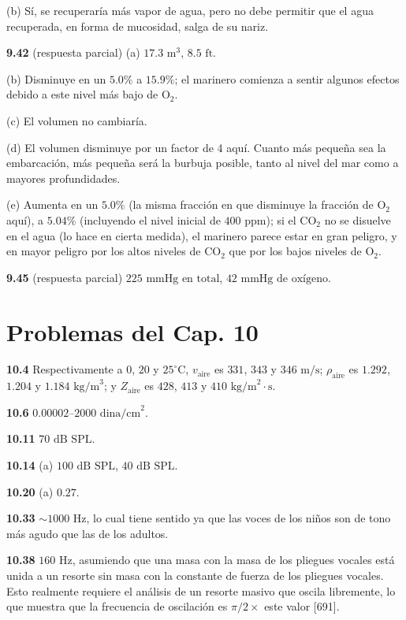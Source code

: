 \documentclass[12pt,a4paper]{book}
\begin{document}
(b) Sí, se recuperaría más vapor de agua, pero no debe permitir que el agua recuperada, en forma de mucosidad, salga de su nariz.

\noindent \textbf{9.42} (respuesta parcial) (a) $17.3\text{ m}^3$, $8.5\text{ ft}$.

(b) Disminuye en un $5.0\%$ a $15.9\%$; el marinero comienza a sentir algunos efectos debido a este nivel más bajo de $\text{O}_2$.

(c) El volumen no cambiaría.

(d) El volumen disminuye por un factor de 4 aquí. Cuanto más pequeña sea la embarcación, más pequeña será la burbuja posible, tanto al nivel del mar como a mayores profundidades.

(e) Aumenta en un $5.0\%$ (la misma fracción en que disminuye la fracción de $\text{O}_2$ aquí), a $5.04\%$ (incluyendo el nivel inicial de $400\text{ ppm}$); si el $\text{CO}_2$ no se disuelve en el agua (lo hace en cierta medida), el marinero parece estar en gran peligro, y en mayor peligro por los altos niveles de $\text{CO}_2$ que por los bajos niveles de $\text{O}_2$.

\noindent \textbf{9.45} (respuesta parcial) $225\text{ mmHg en total}$, $42\text{ mmHg de oxígeno}$.

\section*{Problemas del Cap. 10}

\noindent \textbf{10.4} Respectivamente a $0$, $20$ y $25^\circ\text{C}$, $v_{\text{aire}}$ es $331$, $343$ y $346\text{ m/s}$; $\rho_{\text{aire}}$ es $1.292$, $1.204$ y $1.184\text{ kg/m}^3$; y $Z_{\text{aire}}$ es $428$, $413$ y $410\text{ kg/m}^2\cdot\text{s}$.

\noindent \textbf{10.6} $0.00002\text{--}2000\text{ dina/cm}^2$.

\noindent \textbf{10.11} $70\text{ dB SPL}$.

\noindent \textbf{10.14} (a) $100\text{ dB SPL}$, $40\text{ dB SPL}$.

\noindent \textbf{10.20} (a) $0.27$.

\noindent \textbf{10.33} $\sim 1000\text{ Hz}$, lo cual tiene sentido ya que las voces de los niños son de tono más agudo que las de los adultos.

\noindent \textbf{10.38} $160\text{ Hz}$, asumiendo que una masa con la masa de los pliegues vocales está unida a un resorte sin masa con la constante de fuerza de los pliegues vocales. Esto realmente requiere el análisis de un resorte masivo que oscila libremente, lo que muestra que la frecuencia de oscilación es $\pi/2 \times$ este valor [691].
\end{document}
